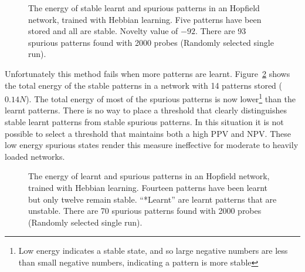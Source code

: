 

\begin{figure}[tbp]
\center
\small
	
	\caption{The energy of stable learnt and spurious patterns in an  Hopfield network, trained with Hebbian learning.  Five patterns have been stored and all are stable.  Novelty value of $-92$.  There are 93 spurious patterns found with 2000 probes (Randomly selected single run). }
	\label{fig:PEmeasure}
\end{figure}

Unfortunately this method fails when more patterns are learnt.  Figure~\ref{fig:PEmeasureOverload} shows the total energy of the stable patterns in a network with 14 patterns stored ($0.14N$). The total energy of most of the spurious patterns is now lower\footnote{Low energy indicates a stable state, and so large negative numbers are less than small negative numbers, indicating a pattern is more stable} than the learnt patterns.  There is no way to place a threshold that clearly distinguishes stable learnt patterns from stable spurious patterns.  In this situation it is not possible to select a threshold that maintains both a high PPV and NPV.  These low energy spurious states render this measure ineffective for moderate to heavily loaded networks.  

\begin{figure}[tbp]
	\center
	\small
		
	\caption{The energy of learnt and spurious patterns in an  Hopfield network, trained with Hebbian learning.  Fourteen patterns have been learnt but only twelve remain stable.  ``*Learnt'' are learnt patterns that are unstable. There are 70 spurious patterns found with 2000 probes (Randomly selected single run).}
	\label{fig:PEmeasureOverload}
\end{figure}


